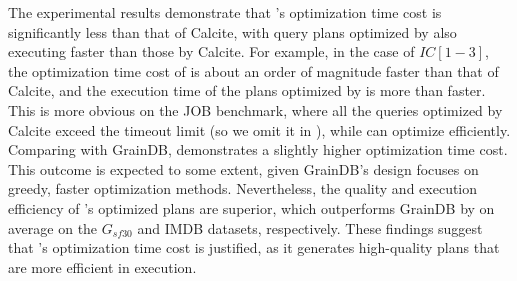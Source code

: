 The experimental results demonstrate that \name's optimization time cost is significantly less than that of Calcite, with query plans optimized by \name also executing faster than those by Calcite.
For example, in the case of $IC[1-3]$, the optimization time cost of \name is about an order of magnitude faster than that of Calcite, and the execution time of the plans optimized by \name is more than  faster.
This is more obvious on the JOB benchmark, where all the queries optimized by Calcite exceed the timeout limit (so we omit it in ), while \name can optimize efficiently.
Comparing with GrainDB, \name demonstrates a slightly higher optimization time cost. This outcome is expected to some extent, given GrainDB's design focuses on greedy, faster optimization methods.
Nevertheless, the quality and execution efficiency of \name's optimized plans are superior, which outperforms GrainDB by  on average on the $G_{sf30}$ and IMDB datasets, respectively.
These findings suggest that \name's optimization time cost is justified, as it generates high-quality plans that are more efficient in execution.


